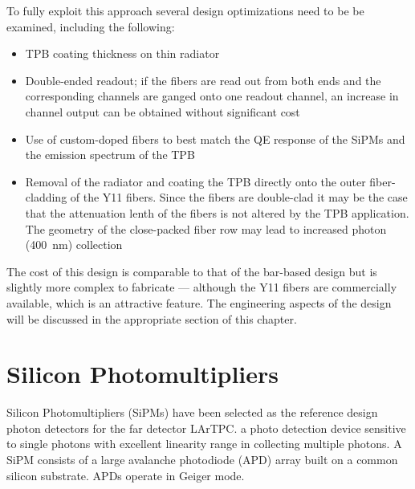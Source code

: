 To fully exploit this approach several design optimizations need to be
be examined, including the following:

\begin{itemize}

\item{TPB coating thickness on thin radiator}

\item{Double-ended readout; if the fibers are read out from both
  ends and the corresponding channels are ganged onto one readout
  channel, an increase in channel output can be obtained without
  significant cost}

\item{Use of custom-doped fibers to best match the QE response of the
  SiPMs and the emission spectrum of the TPB}

\item{Removal of the radiator and coating the TPB directly onto the outer
  fiber-cladding of the Y11 fibers. Since the fibers are double-clad
  it may be the case that the attenuation lenth of the fibers is not
  altered by the TPB application. The geometry of the close-packed
  fiber row may lead to increased photon (400~nm) collection}

\end{itemize}

The cost of this design is comparable to that of the bar-based design
but is slightly more complex to fabricate --- although the Y11 fibers
are commercially available, which is an attractive feature. The
engineering aspects of the design will be discussed in the appropriate
section of this chapter. 

\section{Silicon Photomultipliers}

Silicon Photomultipliers (SiPMs) have been selected as the reference design  photon
detectors for the far detector LArTPC.%
a photo detection device sensitive to single photons with excellent
linearity range  in collecting multiple photons.  A SiPM consists of a
large avalanche photodiode (APD) array built on a common silicon
substrate. APDs operate in Geiger mode.  

